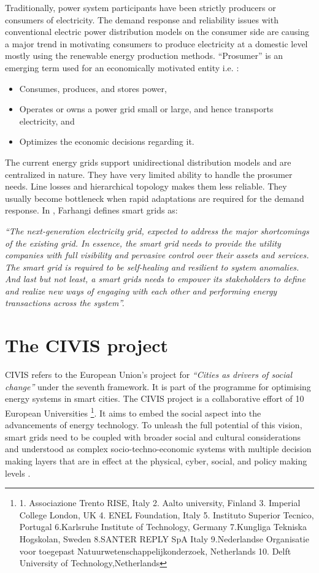 Traditionally, power system participants have been strictly producers or consumers of electricity. The demand response and reliability issues with conventional electric power distribution models on the consumer side are causing a major trend in motivating consumers to produce electricity at a domestic level mostly using the renewable energy production methods. ``Prosumer'' is an emerging term used for an economically motivated entity i.e. \cite{grijalva2011prosumer}:
\begin{itemize}
\item Consumes, produces, and stores power,
\item Operates or owns a power grid small or large, and hence transports electricity, and
\item Optimizes the economic decisions regarding it.
\end{itemize}

The current energy grids support unidirectional distribution models and are centralized in nature.  They have very limited ability to handle the prosumer needs. Line losses and hierarchical topology makes them less reliable. They usually become bottleneck when rapid adaptations are required for the  demand response. In \cite{farhangi2010path}, Farhangi defines smart grids as:

 \emph{``The next-generation electricity grid, expected to address the major shortcomings of the existing grid. In essence, the smart grid needs to provide the utility companies with full visibility and pervasive control over their assets and services. The smart grid is required to be self-healing and resilient to system anomalies. And last but not least, a smart grids needs to empower its stakeholders to define and realize new ways of engaging with each other and performing energy transactions across the system''.}

\section{The CIVIS project} \label{civisproject}

CIVIS refers to the European Union's project for \emph{``Cities as drivers of social change''} under the seventh framework. It is part of the programme for optimising energy systems in smart cities. The CIVIS project is a collaborative effort of 10 European Universities \footnote{1. Associazione Trento RISE, Italy 2. Aalto university, Finland 3. Imperial College London, UK 4. ENEL Foundation, Italy 5. Instituto Superior Tecnico, Portugal 6.Karlsruhe Institute of Technology, Germany 7.Kungliga Tekniska Hogskolan, Sweden 8.SANTER REPLY SpA Italy 9.Nederlandse Organisatie voor toegepast Natuurwetenschappelijkonderzoek, Netherlands 10. Delft University of Technology,Netherlands}. It aims to embed the social aspect into the advancements of energy technology. To unleash the full potential of this vision, smart grids need to be coupled with broader social and cultural considerations and understood as complex socio-techno-economic systems with multiple decision making layers that are in effect at the physical, cyber, social, and policy making levels \cite{civisproposal}.

